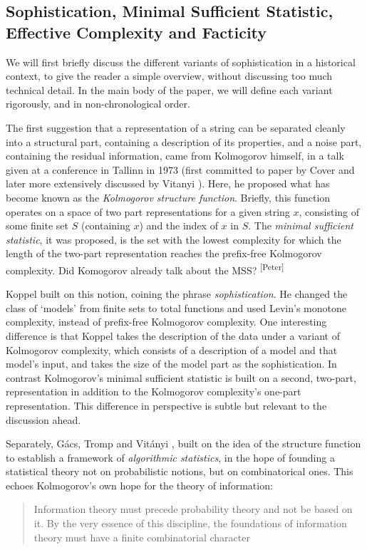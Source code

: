 \documentclass{style/llncs}
\newcommand{\pb}[1]{\textcolor{OliveGreen}{\small #1 \textsuperscript{[Peter]} }}
\begin{document}
\subsection{Sophistication, Minimal Sufficient Statistic, Effective Complexity and Facticity}

We will first briefly discuss the different variants of sophistication in a historical context, to give the reader a simple overview, without discussing too much technical detail. In the main body of the paper, we will define each variant rigorously, and in non-chronological order.

The first suggestion that a representation of a string can be separated cleanly into a structural part, containing a description of its properties, and a noise part, containing the residual information, came from Kolmogorov himself, in a talk given at a conference in Tallinn in 1973 (first committed to paper by Cover \cite{todo} and later more extensively discussed by Vitanyi \cite{todo}). Here, he proposed what has become known as the \emph{Kolmogorov structure function}. Briefly, this function operates on a space of two part representations for a given string $x$, consisting of some finite set $S$ (containing $x$) and the index of $x$ in $S$. The \emph{minimal sufficient statistic}, it was proposed, is the set with the lowest complexity for which the length of the two-part representation reaches the prefix-free Kolmogorov complexity. \pb{Did Komogorov already talk about the MSS?}

Koppel \cite{} built on this notion, coining the phrase \emph{sophistication}. He changed the class of `models' from finite sets to total functions and used Levin's monotone complexity, instead of prefix-free Kolmogorov complexity. One interesting difference is that Koppel takes the description of the data under a variant of Kolmogorov complexity, which consists of a description of a model and that model's input, and takes the size of the model part as the sophistication. In contrast Kolmogorov's minimal sufficient statistic is built on a second, two-part, representation in addition to the Kolmogorov complexity's one-part representation. This difference in perspective is subtle but relevant to the discussion ahead.

Separately, G\'acs, Tromp and Vit\'anyi \cite{}, built on the idea of the structure function to establish a framework of \emph{algorithmic statistics}, in the hope of founding a statistical theory not on probabilistic notions, but on combinatorical ones. This echoes Kolmogorov's own hope for the theory of information:
\begin{quotation}
\noindent Information theory must precede probability theory and not be based on it. By the very essence of this discipline, the foundations of information theory must have a finite combinatorial character
\end{quotation} 
\end{document}
